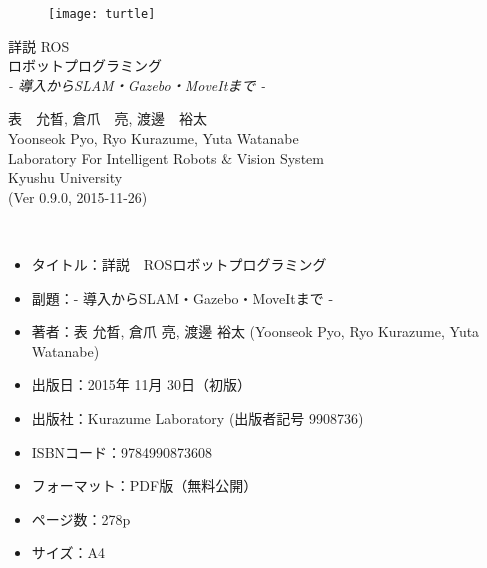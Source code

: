 \documentclass[11pt,fleqn]{book} %
\begin{document}
\begingroup
\thispagestyle{empty}
\centering
\vspace*{3cm}

\begin{figure}[htp]
\centering\hspace{30pt}\texttt{[image: turtle]}
\end{figure}

\vspace*{1cm}
\par\normalfont\fontsize{35}{35}\sffamily\selectfont
詳説 ROS\\%
ロボットプログラミング\\%
{\LARGE \textit{- 導入からSLAM・Gazebo・MoveItまで -}}\par
\vspace*{5cm}
{\Large 表　允晳, 倉爪　亮, 渡邊　裕太}\\
\vspace*{-0.5cm}
{\Large Yoonseok Pyo, Ryo Kurazume, Yuta Watanabe}\\
\vspace*{1cm}
{\Large Laboratory For Intelligent Robots \& Vision System\\Kyushu University}\\
\vspace*{2cm}
{\large (Ver 0.9.0, 2015-11-26)}\\ %
\endgroup

\newpage
\thispagestyle{empty}

\noindent{\LARGE [本の紹介]}\\
\normalsize
\begin{itemize}[leftmargin=*]
\item タイトル：詳説　ROSロボットプログラミング
\item 副題：- 導入からSLAM・Gazebo・MoveItまで -
\item 著者：表 允晳, 倉爪 亮, 渡邊 裕太 (Yoonseok Pyo, Ryo Kurazume, Yuta Watanabe)
\item 出版日：2015年 11月 30日（初版）
\item 出版社：Kurazume Laboratory (出版者記号 9908736)
\item ISBNコード：9784990873608
\item フォーマット：PDF版（無料公開）
\item ページ数：278p
\item サイズ：A4
\end{itemize}
\vspace*{1cm}
\end{document}
